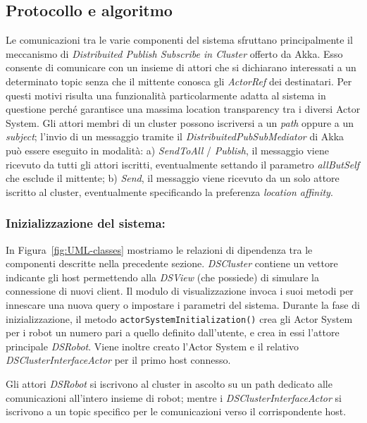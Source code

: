 \subsection{Protocollo e algoritmo}
\label{sec:protocols}

Le comunicazioni tra le varie componenti del sistema sfruttano
principalmente il meccanismo di
\emph{Distribuited Publish Subscribe in Cluster} offerto da Akka.
Esso consente di comunicare con un insieme di attori che si
dichiarano interessati a un determinato topic senza che il mittente
conosca gli \emph{ActorRef} dei destinatari. Per questi motivi
risulta una funzionalità particolarmente adatta al sistema in questione
perché garantisce una massima location transparency tra i diversi
Actor System.
Gli attori membri di un cluster possono iscriversi a un \emph{path}
oppure a un \emph{subject}; l'invio di un messaggio tramite il
\emph{DistribuitedPubSubMediator} di Akka può essere eseguito in
modalità: a) \emph{SendToAll} / \emph{Publish}, il messaggio viene
ricevuto da tutti gli attori iscritti, eventualmente settando il
parametro \emph{allButSelf} che esclude il mittente;
b) \emph{Send}, il messaggio viene ricevuto da un solo attore
iscritto al cluster, eventualmente specificando la preferenza
\emph{location affinity}.

\subsubsection*{Inizializzazione del sistema:}
In Figura~\ref{fig:UML-classes} mostriamo le relazioni di
dipendenza tra le componenti descritte nella precedente sezione.
\emph{DSCluster} contiene un vettore indicante gli host
permettendo alla \emph{DSView} (che possiede) di simulare
la connessione di nuovi client.
Il modulo di visualizzazione invoca i suoi metodi per innescare
una nuova query o impostare i parametri del sistema.
Durante la fase di inizializzazione,
il metodo \texttt{actorSystemInitialization()} crea gli Actor
System per i robot
un numero pari a quello definito dall'utente,
e crea in essi l'attore principale \emph{DSRobot}. Viene inoltre
creato l'Actor System e il relativo \emph{DSClusterInterfaceActor}
per il primo host connesso.

Gli attori \emph{DSRobot} si iscrivono al cluster in ascolto su un
path dedicato alle comunicazioni all'intero insieme di robot;
mentre i \emph{DSClusterInterfaceActor} si iscrivono a un topic
specifico per le comunicazioni verso il corrispondente host.

